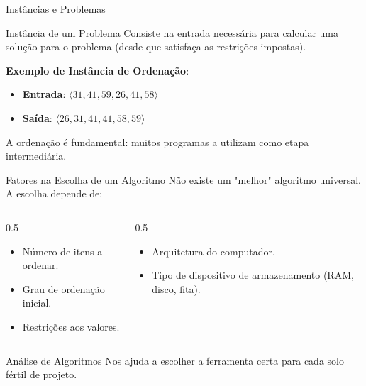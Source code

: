 \documentclass[9pt]{beamer}
\begin{document}
\begin{frame}{Instâncias e Problemas}
    \begin{block}{Instância de um Problema}
        Consiste na entrada necessária para calcular uma solução para o problema (desde que satisfaça as restrições impostas).
    \end{block}
    \vspace{0.4cm}
    \textbf{Exemplo de Instância de Ordenação}:
    \begin{itemize}
        \item \textbf{Entrada}: $\langle 31, 41, 59, 26, 41, 58 \rangle$
        \item \textbf{Saída}: $\langle 26, 31, 41, 41, 58, 59 \rangle$
    \end{itemize}
    \vspace{0.3cm}
    A ordenação é fundamental: muitos programas a utilizam como etapa intermediária.
\end{frame}

\begin{frame}{Fatores na Escolha de um Algoritmo}
    Não existe um "melhor" algoritmo universal. A escolha depende de:
    \vspace{0.3cm}
    \begin{columns}
        \begin{column}{0.5\textwidth}
            \begin{itemize}
                \item Número de itens a ordenar.
                \item Grau de ordenação inicial.
                \item Restrições aos valores.
            \end{itemize}
        \end{column}
        \begin{column}{0.5\textwidth}
            \begin{itemize}
                \item Arquitetura do computador.
                \item Tipo de dispositivo de armazenamento (RAM, disco, fita).
            \end{itemize}
        \end{column}
    \end{columns}
    \vspace{0.5cm}
    \begin{alertblock}{Análise de Algoritmos}
        Nos ajuda a escolher a ferramenta certa para cada solo fértil de projeto.
    \end{alertblock}
\end{frame}
\end{document}
